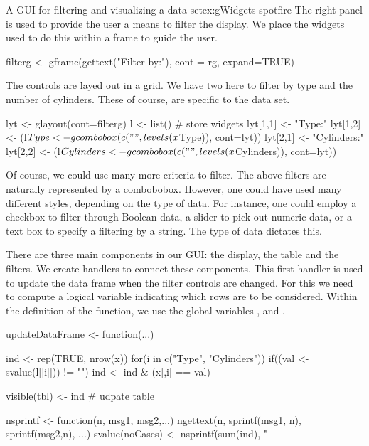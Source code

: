 \begin{example}{A GUI for filtering and visualizing a data set}{ex:gWidgets-spotfire}
The right panel is used to provide the user a means to filter the
display. We place the widgets used to do this within a frame to guide
the user.
\begin{Schunk}
\begin{Sinput}
 filterg <- gframe(gettext("Filter by:"), cont = rg, expand=TRUE)
\end{Sinput}
\end{Schunk}
The controls are layed out in a grid. We have two here to filter by
type and the number of cylinders. These of course, are specific to the
data set.
\begin{Schunk}
\begin{Sinput}
 lyt <- glayout(cont=filterg)
 l <- list() # store widgets
 lyt[1,1] <- "Type:"
 lyt[1,2] <- (l$Type <- gcombobox(c("", levels(x$Type)), cont=lyt))
 lyt[2,1] <- "Cylinders:"
 lyt[2,2] <- (l$Cylinders <- gcombobox(c("", levels(x$Cylinders)), cont=lyt))
\end{Sinput}
\end{Schunk}
%
Of course, we could use many more criteria to filter. The above
filters are naturally represented by a combobobox. However, one could
have used many different styles, depending on the type of data. For
instance, one could employ a checkbox to filter through Boolean data,
a slider to pick out numeric data, or a text box to specify a
filtering by a string. The type of data dictates this.

There are three main components in our GUI: the display, the table and
the filters. We create handlers to connect these components. This
first handler is used to
update the data frame when the filter controls are changed. For this
we need to compute a logical variable indicating which rows are to be
considered.  Within the definition of the function, we use the global
variables ,  and .
\begin{Schunk}
\begin{Sinput}
 updateDataFrame <- function(...) {
   ind <- rep(TRUE, nrow(x))
   for(i in c("Type", "Cylinders"))  {
     if((val <- svalue(l[[i]])) != "") 
       ind <- ind & (x[,i] == val)
   }
   
   visible(tbl) <- ind                   # udpate table
   
   nsprintf <- function(n, msg1, msg2,...)
     ngettext(n, sprintf(msg1, n), sprintf(msg2,n), ...)
   svalue(noCases) <- nsprintf(sum(ind), "%
 }
\end{Sinput}
\end{Schunk}


\end{example}
